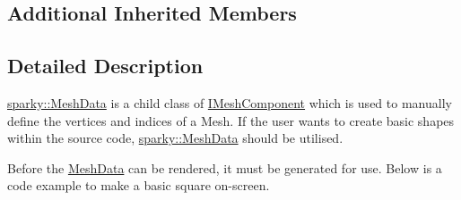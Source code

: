 \subsection*{Additional Inherited Members}


\subsection{Detailed Description}
\hyperlink{classsparky_1_1_mesh_data}{sparky\+::\+Mesh\+Data} is a child class of \hyperlink{classsparky_1_1_i_mesh_component}{I\+Mesh\+Component} which is used to manually define the vertices and indices of a Mesh. If the user wants to create basic shapes within the source code, \hyperlink{classsparky_1_1_mesh_data}{sparky\+::\+Mesh\+Data} should be utilised.

Before the \hyperlink{classsparky_1_1_mesh_data}{Mesh\+Data} can be rendered, it must be generated for use. Below is a code example to make a basic square on-\/screen.

